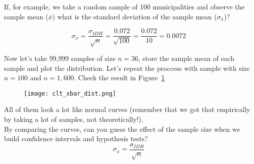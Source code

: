 \documentclass[11pt]{article}
\begin{document}
If, for example, we take a random sample of 100 municipalities and observe the sample mean ($\bar{x}$) what is the standard deviation of the sample mean ($\sigma_{\bar{x}}$)?

\[\sigma_{\bar{x}} = \frac{\sigma_{IDH}}{\sqrt{n}} = \frac{0.072}{\sqrt{100}} = \frac{0.072}{10} = 0.0072\]

	Now let's take 99,999 samples of size $n=36$, store the sample mean of each sample and plot the distribution. Let's repeat the proccess with sample with size $n=100$ and $n=1,600$. Check the result in Figure~\ref{f3}

	\begin{figure}[htp]
\centering
\texttt{[image: clt\_xbar\_dist.png]}
\caption{}
\label{f3}
\end{figure}

	All of them look a lot like normal curves (remember that we got that empirically by taking a lot of samples, not theoretically!).
	\newline\\
	By comparing the curves, can you guess the effect of the sample size when we build confidence intervals and hypothesis tests?	
\[\sigma_{\bar{x}} = \frac{\sigma_{IDH}}{\sqrt{n}}\]
\end{document}
